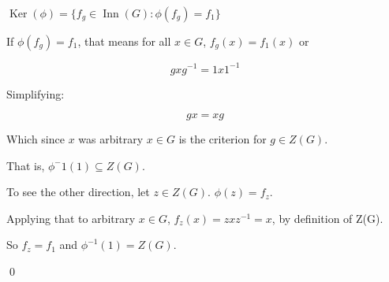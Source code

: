 \documentclass[11pt,oneside]{article}
\numberwithin{equation}{section}
\theoremstyle{definition}
\def\Inn{\operatorname{Inn}}
\def\Ker{\operatorname{Ker}}
\begin{document}
\begin{solution}
\begin{enumerate}[(a)]
\begin{itemize}
\begin{itemize}
          $ \Ker(\phi) = \{ f_g \in \Inn(G) : \phi(f_g) = f_1 \}$

          If $\phi(f_g) = f_1$, that means for all $x \in G$, $f_g(x) = f_1(x)$ or

          $$
          gxg^{-1} = 1x1^{-1}
          $$

          Simplifying:

          $$
          gx = xg
          $$

          Which since $x$ was arbitrary $x \in G$ is the criterion for $ g \in Z(G)$.

          That is, $\phi ^ -1(1) \subseteq  Z(G)$.

          To see the other direction, let $z \in Z(G)$.  $\phi(z) = f_z$.

          Applying that to arbitrary $x \in G$, $f_z(x) = zxz^{-1} = x$, by definition of Z(G).

          So $f_z = f_1$ and $\phi^{-1} (1) = Z(G)$.

          \qed

        \end{itemize}
      \end{itemize}
    \end{enumerate}
\end{solution}
\end{document}

